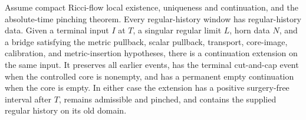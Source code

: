 \begin{theorem}
\label{thm:branch-continuation}
Assume compact Ricci-flow local existence, uniqueness and continuation,
and the absolute-time pinching theorem.  Every regular-history window has
regular-history data.  Given a terminal input $I$ at $T$, a singular regular
limit $L$, horn data $N$, and a bridge satisfying the metric pullback,
scalar pullback, transport, core-image, calibration, and metric-insertion
hypotheses, there is a continuation extension on the same input.  It
preserves all earlier events, has the terminal cut-and-cap event when the
controlled core is nonempty, and has a permanent empty continuation when the
core is empty.  In either case the extension has a positive surgery-free
interval after $T$, remains admissible and pinched, and contains the supplied
regular history on its old domain.
\cite[Lemma 15.11, p. 364; Theorem 15.9, pp. 363--366 and 409--410]{MT2007}
\end{theorem}

